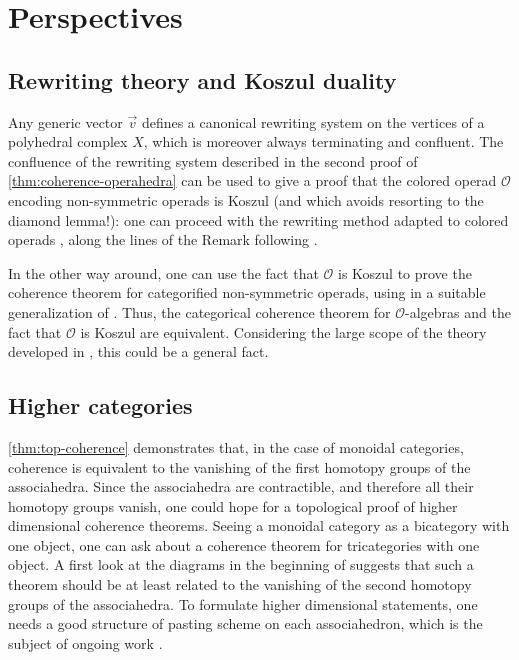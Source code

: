 
\section{Perspectives}




\subsection{Rewriting theory and Koszul duality}
Any generic vector $\vec v$ defines a canonical rewriting system on the vertices of a polyhedral complex $X$, which is moreover always terminating and confluent. 
The confluence of the rewriting system described in the second proof of \cref{thm:coherence-operahedra} can be used to give a proof that the colored operad $\mathcal{O}$ \cite[Definition 4.2]{laplante-anfossiDiagonalOperahedra2022a} encoding non-symmetric operads is Koszul (and which avoids resorting to the diamond lemma!): one can proceed with the rewriting method \cite[Section 8.3]{LodayVallette12} adapted to colored operads \cite{KhariKhoro20}, along the lines of the Remark following \cite[Theorem 9.1.5]{LodayVallette12}. 

In the other way around, one can use the fact that $\mathcal{O}$ is Koszul to prove the coherence theorem for categorified non-symmetric operads, using \cite[Theorem 15]{marklCoherenceConstraintsOperads2001} in a suitable generalization of \cite[Example 16]{marklCoherenceConstraintsOperads2001}.
Thus, the categorical coherence theorem for $\mathcal{O}$-algebras and the fact that $\mathcal{O}$ is Koszul are equivalent.
Considering the large scope of the theory developed in \cite{marklCoherenceConstraintsOperads2001}, this could be a general fact. 


\subsection{Higher categories} 
\label{sec:higher}
\cref{thm:top-coherence} demonstrates that, in the case of monoidal categories, coherence is equivalent to the vanishing of the first homotopy groups of the associahedra. 
Since the associahedra are contractible, and therefore all their homotopy groups vanish, one could hope for a topological proof of higher dimensional coherence theorems.
Seeing a monoidal category as a bicategory with one object, one can ask about a coherence theorem for tricategories with one object. 
A first look at the diagrams in the beginning of \cite[Section 2]{gordonCoherenceTricategories1995} suggests that such a theorem should be at least related to the vanishing of the second homotopy groups of the associahedra.  
To formulate higher dimensional statements, one needs a good structure of pasting scheme on each associahedron, which is the subject of ongoing work \cite{AMMLA}. 

